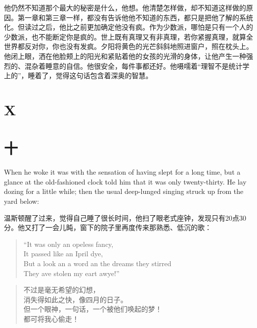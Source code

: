 \begin{paracol}{2}
\switchcolumn

他仍然不知道那个最大的秘密是什么，他想。他清楚怎样做，却不知道这样做的原因。第一章和第三章一样，都没有告诉他他不知道的东西，都只是把他了解的系统化。但读过之后，他比之前更加确定他没有疯。作为少数派，哪怕是只有一个人的少数派，也不能断定你是疯的。世上既有真理又有非真理，若你紧握真理，就算全世界都反对你，你也没有发疯。夕阳将黄色的光芒斜斜地照进窗户，照在枕头上。他闭上眼，洒在他脸颊上的阳光和紧贴着他的女孩的光滑的身体，让他产生一种强烈的、混杂着睡意的自信。他很安全，每件事都还好。他嗫嚅着``理智不是统计学上的''，睡着了，觉得这句话包含着深奥的智慧。

\switchcolumn*


\section{X}\label{x}

\switchcolumn

\section*{十}\label{ux5341ux516b}

\switchcolumn*

When he woke it was with the sensation of having slept for a long time,
but a glance at the old-fashioned clock told him that it was only
twenty-thirty. He lay dozing for a little while; then the usual
deep-lunged singing struck up from the yard below:

\switchcolumn

温斯顿醒了过来，觉得自己睡了很长时间，他扫了眼老式座钟，发现只有20点30分。他又打了一会儿盹，窗下的院子里再度传来那熟悉、低沉的歌：

\switchcolumn*

\begin{quotation}
  ``It was only an \textquotesingle opeless fancy,\\
  It passed like an Ipril dye,\\
  But a look an\textquotesingle{} a word an\textquotesingle{} the
  dreams they stirred\\
  They \textquotesingle ave stolen my \textquotesingle eart awye!''
\end{quotation}

\switchcolumn

\begin{quotation}
  \noindent
不过是毫无希望的幻想，\\
消失得如此之快，像四月的日子。\\
但一个眼神，一句话，一个被他们唤起的梦！\\
都可将我心偷走！
\end{quotation}


\end{paracol}

